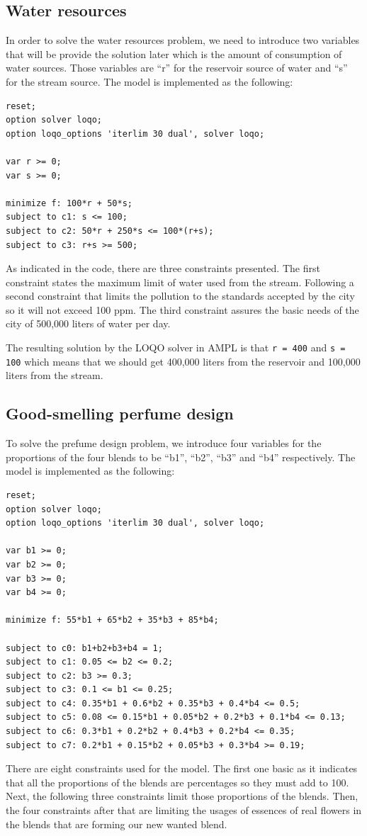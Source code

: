 \subsection{Water resources}
In order to solve the water resources problem, we need to introduce two variables that will be provide the solution later which is the amount of consumption of water sources. Those variables are ``r'' for the reservoir source of water and ``s'' for the stream source. The model is implemented as the following:
\begin{verbatim}
reset;
option solver loqo;
option loqo_options 'iterlim 30 dual', solver loqo;

var r >= 0;
var s >= 0;

minimize f: 100*r + 50*s;
subject to c1: s <= 100;
subject to c2: 50*r + 250*s <= 100*(r+s);
subject to c3: r+s >= 500;
\end{verbatim}
As indicated in the code, there are three constraints presented. The first constraint states the maximum limit of water used from the stream. Following a second constraint that limits the pollution to the standards accepted by the city so it will not exceed 100 ppm. The third constraint assures the basic needs of the city of 500,000 liters of water per day.

The resulting solution by the LOQO solver in AMPL is that \texttt{r = 400} and \texttt{s = 100} which means that we should get 400,000 liters from the reservoir and 100,000 liters from the stream.

\subsection{Good-smelling perfume design}
To solve the prefume design problem, we introduce four variables for the proportions of the four blends to be ``b1'', ``b2'', ``b3'' and ``b4'' respectively. The model is implemented as the following:
\begin{verbatim}
reset;
option solver loqo;
option loqo_options 'iterlim 30 dual', solver loqo;

var b1 >= 0;
var b2 >= 0;
var b3 >= 0;
var b4 >= 0;

minimize f: 55*b1 + 65*b2 + 35*b3 + 85*b4;

subject to c0: b1+b2+b3+b4 = 1;
subject to c1: 0.05 <= b2 <= 0.2;
subject to c2: b3 >= 0.3;
subject to c3: 0.1 <= b1 <= 0.25;
subject to c4: 0.35*b1 + 0.6*b2 + 0.35*b3 + 0.4*b4 <= 0.5;
subject to c5: 0.08 <= 0.15*b1 + 0.05*b2 + 0.2*b3 + 0.1*b4 <= 0.13;
subject to c6: 0.3*b1 + 0.2*b2 + 0.4*b3 + 0.2*b4 <= 0.35;
subject to c7: 0.2*b1 + 0.15*b2 + 0.05*b3 + 0.3*b4 >= 0.19;
\end{verbatim}
There are eight constraints used for the model. The first one basic as it indicates that all the proportions of the blends are percentages so they must add to 100. Next, the following three constraints limit those proportions of the blends. Then, the four constraints after that are limiting the usages of essences of real flowers in the blends that are forming our new wanted blend.

